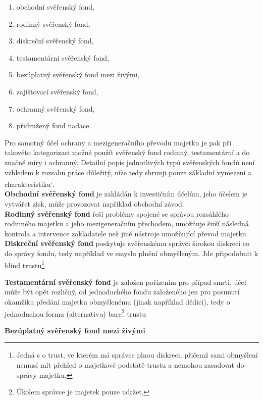\documentclass{article}
\begin{document}
\begin{enumerate}
\item obchodní svěřenský fond,
\item rodinný svěřenský fond,
\item diskreční svěřenský fond,
\item testamentární svěřenský fond,
\item bezúplatný svěřenský fond mezi živými,
\item zajišťovací svěřenský fond,
\item ochranný svěřenský fond,
\item přidružený fond nadace.
\end{enumerate}

Pro samotný účel ochrany a mezigeneračního převodu majetku je pak při takovéto kategorizaci možné použít svěřenský fond rodinný, testamentární a do značné míry i ochranný. Detailní popis jednotlivých typů svěřenských fondů není vzhledem k rozsahu práce důležitý, níže tedy shrnuji pouze základní vymezení a charakteristiku\textsuperscript{,}.\\

\textbf{Obchodní svěřenský fond} je zakládán k investičním účelům, jeho účelem je vytvářet zisk, může provozovat například obchodní závod.\\

\textbf{Rodinný svěřenský fond} řeší problémy spojené se správou rozsáhlého rodinného majetku a jeho mezigeneračním přechodem, umožňuje širší následná kontrola a intervence zakladatele než jiné nástroje umožňující převod majetku.\\

\textbf{Diskreční svěřenský fond} poskytuje svěřenskému správci širokou diskreci co do správy fondu, tedy například ve smyslu plnění obmyšleným. Jde připodobnit k blind trustu\footnote{Jedná s o trust, ve kterém má správce plnou diskreci, přičemž sami obmyšlení nemusí mít přehled o majetkové podstatě trustu a nemohou zasadovat do správy majetku.}

\textbf{Testamentární svěřenský fond} je založen pořízením pro případ smrti, účel může být opět rozličný, od jednoduchého fondu založeného jen pro posunutí okamžiku předání majetku obmyšlenému (jinak například dědici), tedy o jednoduchou formu (alternativu) bare\footnote{Úkolem správce je majetek pouze udržet.} trustu

\textbf{Bezúplatný svěřenský fond mezi živými}
\end{document}

